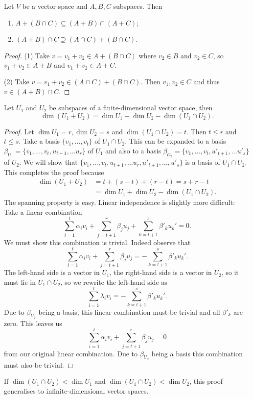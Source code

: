 \begin{proposition}
Let $V$ be a vector space and $A,B,C$ subspaces. Then
\begin{enumerate}
\item $A+(B\cap C) \subseteq (A+B)\cap (A+C)$;
\item $(A+B)\cap C \supseteq (A\cap C) + (B\cap C)$. 
\end{enumerate}
\end{proposition}
\begin{proof}
(1) Take $v = v_1+v_2 \in A+(B\cap C)$ where $v_2 \in B$ and $v_2 \in C$, so $v_1+v_2\in A+B$ and $v_1+v_2\in A+C$.

(2) Take $v = v_1+v_2\in (A\cap C) + (B\cap C)$. Then $v_1,v_2\in C$ and thus $v\in (A+B)\cap C$.
\end{proof}

\begin{theorem}
Let $U_1$ and $U_2$ be subspaces of a finite-dimensional vector space, then
\[ \dim(U_1 + U_2) = \dim U_1 + \dim U_2 - \dim(U_1\cap U_2). \]
\label{dimOfASum}
\end{theorem}
\begin{proof}
Let $\dim U_1 = r, \dim U_2 = s$ and $\dim(U_1\cap U_2) = t$. Then $t\leq r$ and $t\leq s$.  Take a basis $\{v_1,\ldots, v_t\}$ of $U_1\cap U_2$. This can be expanded to a basis $\beta_{U_1} = \{ v_1, \ldots, v_t, u_{t+1}, \ldots u_{r} \}$ of $U_1$ and also to a basis $\beta_{U_2} = \{ v_1, \ldots, v_t, u'_{t+1}, \ldots u'_{s} \}$ of $U_2$. We will show that $\{ v_1, \ldots, v_t, u_{t+1}, \ldots u_{r}, u'_{t+1}, \ldots, u'_{s} \}$ is a basis of $U_1\cap U_2$. This completes the proof because
\begin{align*}
\dim(U_1 + U_2) &= t + (s-t) + (r-t) = s + r -t\\
&= \dim U_1 + \dim U_2 - \dim(U_1\cap U_2).
\end{align*}
The spanning property is easy. Linear independence is slightly more difficult: Take a linear combination
\[ \sum_{i=1}^t\alpha_i v_i + \sum^r_{j=t+1}\beta_ju_j + \sum^s_{k=t+1}\beta'_ku_k' =0. \]
We must show this combination is trivial. Indeed observe that
\[ \sum_{i=1}^t\alpha_i v_i + \sum^r_{j=t+1}\beta_ju_j  =-\sum^s_{k=t+1}\beta'_ku_k'. \]
The left-hand side is a vector in $U_1$, the right-hand side is a vector in $U_2$, so it must lie in $U_1\cap U_2$, so we rewrite the left-hand side as
\[ \sum_{i=1}^t\lambda_i v_i =  -\sum^s_{k=t+1}\beta'_ku_k'.\]
Due to $\beta_{U_2}$ being a basis, this linear combination must be trivial and all $\beta'_k$ are zero. This leaves us 
\[ \sum_{i=1}^t\alpha_i v_i + \sum^r_{j=t+1}\beta_ju_j =0 \]
from our original linear combination. Due to $\beta_{U_2}$ being a basis this combination must also be trivial. 
\end{proof}
\begin{note}
If $\dim(U_1\cap U_2)<\dim U_1$ and $\dim(U_1\cap U_2)< \dim U_2$, this proof generalises to infinite-dimensional vector spaces.
\end{note}

